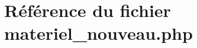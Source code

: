 \hypertarget{materiel__nouveau_8php}{
\section{R\'{e}f\'{e}rence du fichier materiel\_\-nouveau.php}
\label{materiel__nouveau_8php}
}
